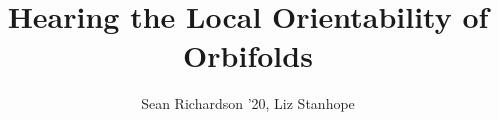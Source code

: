 \documentclass[final]{beamer}
\title{Hearing the Local Orientability of Orbifolds} %
\author{Sean Richardson '20, Liz Stanhope} %
\institute{Department of Mathematical Sciences, Lewis \& Clark College} %
\newlength{\onecolwid}
\begin{document}

\setlength{\belowcaptionskip}{2ex} %
\setlength\belowdisplayshortskip{2ex} %

\begin{frame}[t] %
\begin{columns}[t] %



\begin{column}{\onecolwid} %


\end{column}
\end{columns}
\end{frame}
\end{document}
